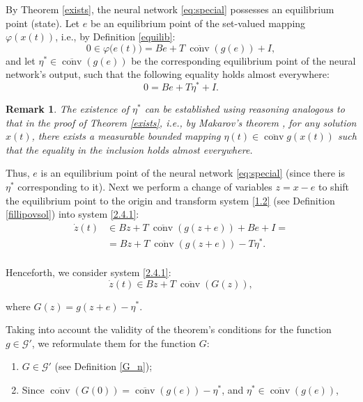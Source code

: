 \documentclass[journal]{IEEEtran}
\newtheorem{remark}{Remark}
\begin{document}
\begin{IEEEproof} 
By Theorem \ref{exists}, the neural network \eqref{eq:special} possesses an equilibrium point (state).
Let $e$ be an equilibrium point of the set-valued mapping $\varphi(x(t))$, i.e., by Definition \ref{equilib}:
\[
0 \in \varphi\big(e(t)\big)=Be+T~\overline{\operatorname{conv}}(g(e))+I ,
\]
and let $\eta^* \in \overline{\operatorname{conv}}(g(e))$ be the corresponding equilibrium point of the neural network's output, such that the following equality holds almost everywhere:
\[
0 = Be + T \eta^*+ I. \tag{a.e.}
\]

\begin{remark}
{The existence of $\eta^*$ can be established using reasoning analogous to that in the proof of Theorem \ref{exists}, i.e., by Makarov’s theorem \cite[p. 38, Th. 1.7]{Leonov}, for any solution $x(t)$, there exists a measurable bounded mapping $\eta(t) \in \overline{\operatorname{conv}}g(x(t))$ such that the equality in the inclusion holds almost everywhere.}
\end{remark}
Thus, $e$ is an equilibrium point of the neural network \eqref{eq:special} (since there is $\eta^*$ corresponding to it). 
Next we perform a change of variables $z=x-e$ to shift the equilibrium point to the origin and transform system \eqref{1.2} (see Definition \ref{fillipovsol}) into system \eqref{2.4.1}:
\[
\begin{aligned}
    \dot z(t) &\in Bz+ T~ \overline{\operatorname{conv}}(g(z+e))+Be+I=\\
    &= Bz+T~ \overline{\operatorname{conv}}(g(z+e)) - T\eta^*.\\
\end{aligned}
\]

Henceforth, we consider system \eqref{2.4.1}:
\begin{equation}\label{2.4.1}
\dot z(t) \in Bz+T~ \overline{\operatorname{conv}}(G(z)),
\end{equation}

where $G(z)=g(z+e)-\eta^*$.

Taking into account the validity of the theorem's conditions for the function $g\in \mathcal{G'}$, we reformulate them for the function $G$:
\begin{enumerate}
    \item $G\in \mathcal{G'}$ (see Definition \ref{G_n});
    
    \item Since $\overline{\operatorname{conv}}(G(0))=\overline{\operatorname{conv}}(g(e)) -\eta^*$, and $\eta^* \in \overline{\operatorname{conv}}(g(e))$, 
    

\end{enumerate}
\end{IEEEproof}
\end{document}
